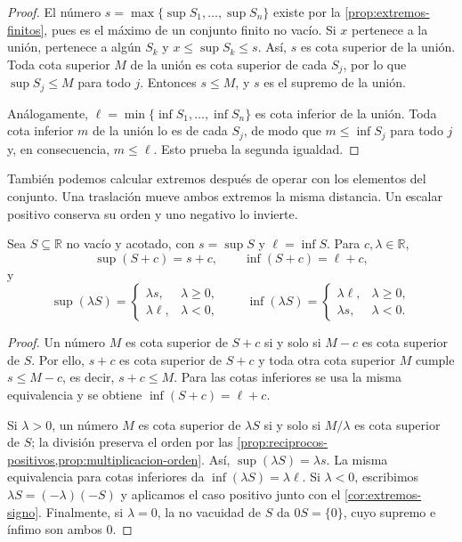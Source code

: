 \begin{proof}
El número $s=\max\{\sup S_1,\ldots,\sup S_n\}$ existe por la \cref{prop:extremos-finitos}, pues es el máximo de un conjunto finito no vacío. Si $x$ pertenece a la unión, pertenece a algún $S_k$ y $x\leq\sup S_k\leq s$. Así, $s$ es cota superior de la unión. Toda cota superior $M$ de la unión es cota superior de cada $S_j$, por lo que $\sup S_j\leq M$ para todo $j$. Entonces $s\leq M$, y $s$ es el supremo de la unión.

Análogamente, $\ell=\min\{\inf S_1,\ldots,\inf S_n\}$ es cota inferior de la unión. Toda cota inferior $m$ de la unión lo es de cada $S_j$, de modo que $m\leq\inf S_j$ para todo $j$ y, en consecuencia, $m\leq\ell$. Esto prueba la segunda igualdad.
\end{proof}

También podemos calcular extremos después de operar con los elementos del conjunto. Una traslación mueve ambos extremos la misma distancia. Un escalar positivo conserva su orden y uno negativo lo invierte.

\begin{samepage}
\begin{proposition}
\label{prop:extremos-afines}
Sea $S\subseteq\mathbb{R}$ no vacío y acotado, con $s=\sup S$ y $\ell=\inf S$. Para $c,\lambda\in\mathbb{R}$,
\[
 \sup(S+c)=s+c,
 \qquad
 \inf(S+c)=\ell+c,
\]
y
\[
 \sup(\lambda S)=
 \begin{cases}
  \lambda s,&\lambda\geq0,\\
  \lambda\ell,&\lambda<0,
 \end{cases}
 \qquad
 \inf(\lambda S)=
 \begin{cases}
  \lambda\ell,&\lambda\geq0,\\
  \lambda s,&\lambda<0.
 \end{cases}
\]
\end{proposition}
\end{samepage}

\begin{proof}
Un número $M$ es cota superior de $S+c$ si y solo si $M-c$ es cota superior de $S$. Por ello, $s+c$ es cota superior de $S+c$ y toda otra cota superior $M$ cumple $s\leq M-c$, es decir, $s+c\leq M$. Para las cotas inferiores se usa la misma equivalencia y se obtiene $\inf(S+c)=\ell+c$.

Si $\lambda>0$, un número $M$ es cota superior de $\lambda S$ si y solo si $M/\lambda$ es cota superior de $S$; la división preserva el orden por las \cref{prop:reciprocos-positivos,prop:multiplicacion-orden}. Así, $\sup(\lambda S)=\lambda s$. La misma equivalencia para cotas inferiores da $\inf(\lambda S)=\lambda\ell$. Si $\lambda<0$, escribimos $\lambda S=(-\lambda)(-S)$ y aplicamos el caso positivo junto con el \cref{cor:extremos-signo}. Finalmente, si $\lambda=0$, la no vacuidad de $S$ da $0S=\{0\}$, cuyo supremo e ínfimo son ambos $0$.
\end{proof}

